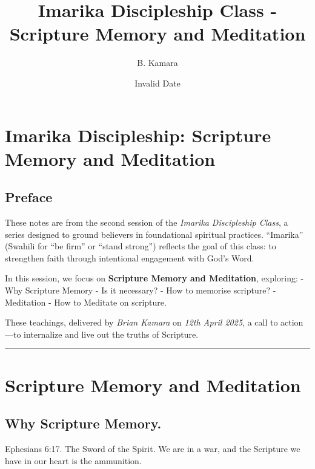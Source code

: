 \documentclass[
  letterpaper,
  DIV=11,
  numbers=noendperiod]{scrartcl}
\title{Imarika Discipleship Class - Scripture Memory and Meditation}
\author{B. Kamara}
\date{Invalid Date}
\renewcommand*\contentsname{Table of contents}
\newcommand\contentsname{Table of contents}
\begin{document}
\maketitle

\renewcommand*\contentsname{Table of contents}
{
\hypersetup{linkcolor=}
\setcounter{tocdepth}{2}
\tableofcontents
}


\chapter{Imarika Discipleship: Scripture Memory and
Meditation}\label{imarika-discipleship-scripture-memory-and-meditation}

\section{Preface}\label{preface}

These notes are from the second session of the \emph{Imarika
Discipleship Class}, a series designed to ground believers in
foundational spiritual practices. ``Imarika'' (Swahili for ``be firm''
or ``stand strong'') reflects the goal of this class: to strengthen
faith through intentional engagement with God's Word.

In this session, we focus on \textbf{Scripture Memory and Meditation},
exploring: - Why Scripture Memory - Is it necessary? - How to memorise
scripture? - Meditation - How to Meditate on scripture.

These teachings, delivered by \emph{Brian Kamara} on \emph{12th April
2025}, a call to action---to internalize and live out the truths of
Scripture.

\begin{center}\rule{0.5\linewidth}{0.5pt}\end{center}


\chapter{Scripture Memory and
Meditation}\label{scripture-memory-and-meditation}

\section{Why Scripture Memory.}\label{why-scripture-memory.}

Ephesians 6:17. The Sword of the Spirit. We are in a war, and the
Scripture we have in our heart is the ammunition.
\end{document}
